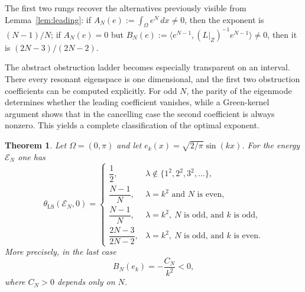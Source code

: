 \documentclass[11pt]{article}
\newtheorem{theorem}{Theorem}[section]
\theoremstyle{definition}
\theoremstyle{remark}
\begin{document}
The first two rungs recover the alternatives previously visible from Lemma~\ref{lem:leading}: if $A_N(e):=\int_\Omega e^N\,dx\ne0$, then the exponent is $(N-1)/N$; if $A_N(e)=0$ but
$B_N(e):=\langle e^{N-1},(L|_Z)^{-1}e^{N-1}\rangle\ne0$, then it is $(2N-3)/(2N-2)$.

The abstract obstruction ladder becomes especially transparent on an interval. There every resonant eigenspace is one dimensional, and the first two obstruction coefficients can be computed explicitly. For odd $N$, the parity of the eigenmode determines whether the leading coefficient vanishes, while a Green-kernel argument shows that in the cancelling case the second coefficient is always nonzero. This yields a complete classification of the optimal exponent.

\begin{theorem}\label{thm:interval-classification}
Let $\Omega=(0,\pi)$ and let $e_k(x)=\sqrt{2/\pi}\sin(kx)$. For the energy $\mathcal E_N$ one has
$$
\theta_{\mathrm{LS}}(\mathcal E_N,0)=
\begin{cases}
\dfrac12, & \lambda\notin\{1^2,2^2,3^2,\ldots\},\\[5pt]
\dfrac{N-1}{N}, & \lambda=k^2\text{ and }N\text{ is even},\\[5pt]
\dfrac{N-1}{N}, & \lambda=k^2,\ N\text{ is odd, and }k\text{ is odd},\\[5pt]
\dfrac{2N-3}{2N-2}, & \lambda=k^2,\ N\text{ is odd, and }k\text{ is even}.
\end{cases}
$$
More precisely, in the last case
$$
B_N(e_k)=-\frac{C_N}{k^2}<0,
$$
where $C_N>0$ depends only on $N$.
\end{theorem}
\end{document}
